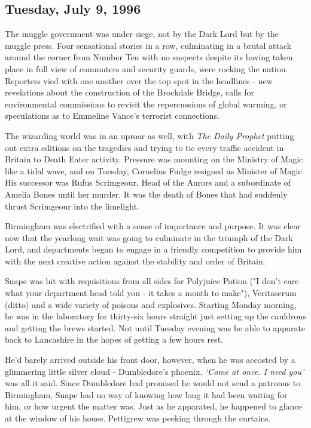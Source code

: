 \documentclass[a4paper,11pt]{article}
\begin{document}
\subsection{Tuesday, July 9, 1996}

The muggle government was under siege, not by the Dark Lord but by the muggle press. Four sensational stories in a row, culminating in a brutal attack around the corner from Number Ten with no suspects despite its having taken place in full view of commuters and security guards, were rocking the nation. Reporters vied with one another over the top spot in the headlines - new revelations about the construction of the Brockdale Bridge, calls for environmental commissions to revisit the repercussions of global warming, or speculations as to Emmeline Vance's terrorist connections.

The wizarding world was in an uproar as well, with \emph{The Daily Prophet} putting out extra editions on the tragedies and trying to tie every traffic accident in Britain to Death Eater activity. Pressure was mounting on the Ministry of Magic like a tidal wave, and on Tuesday, Cornelius Fudge resigned as Minister of Magic. His successor was Rufus Scrimgeour, Head of the Aurors and a subordinate of Amelia Bones until her murder. It was the death of Bones that had suddenly thrust Scrimgeour into the limelight.

Birmingham was electrified with a sense of importance and purpose. It was clear now that the yearlong wait was going to culminate in the triumph of the Dark Lord, and departments began to engage in a friendly competition to provide him with the next creative action against the stability and order of Britain.

Snape was hit with requisitions from all sides for Polyjuice Potion ("I don't care what your department head told you - it takes a month to make"), Veritaserum (ditto) and a wide variety of poisons and explosives. Starting Monday morning, he was in the laboratory for thirty-six hours straight just setting up the cauldrons and getting the brews started. Not until Tuesday evening was he able to apparate back to Lancashire in the hopes of getting a few hours rest.

He'd barely arrived outside his front door, however, when he was accosted by a glimmering little silver cloud - Dumbledore's phoenix. \emph{`Come at once. I need you'} was all it said. Since Dumbledore had promised he would not send a patronus to Birmingham, Snape had no way of knowing how long it had been waiting for him, or how urgent the matter was. Just as he apparated, he happened to glance at the window of his house. Pettigrew was peeking through the curtains.
\end{document}
